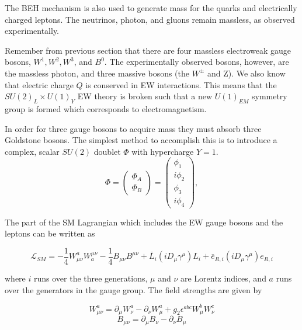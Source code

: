 The BEH mechanism is also used to generate mass for the quarks and electrically charged leptons. The neutrinos, photon, and gluons remain massless, as observed experimentally.
	
Remember from previous section that there are four massless electroweak gauge bosons, $W^{1}, W^{2}, W^{3}$, and $B^{0}$. The experimentally observed bosons, however, are the massless photon, and three massive bosons (the $W^{\pm}$ and Z). We also know that electric charge $Q$ is conserved in EW interactions. This means that the $SU(2)_{L}\times U(1)_{Y}$ EW theory is broken such that a new $U(1)_{EM}$ symmetry group is formed which corresponds to electromagnetism. 
	
In order for three gauge bosons to acquire mass they must absorb three Goldstone bosons. The simplest method to accomplish this is to introduce a complex, scalar $SU(2)$ doublet $\Phi$ with hypercharge $Y=1$.
	\begin{equation}
		\Phi = \begin{pmatrix}
		\Phi_{A} \\
		\Phi_{B}
		\end{pmatrix} = \begin{pmatrix} \phi_{1} \\ i\phi_{2} \\ \phi_{3} \\ i\phi_{4} \end{pmatrix},
	\end{equation}

The part of the SM Lagrangian which includes the EW gauge bosons and the leptons can be written as

	\begin{equation}
	\mathcal{L}_{SM} = -\frac{1}{4}W_{\mu\nu}^{a}W_{a}^{\mu\nu} - \frac{1}{4}B_{\mu\nu}B^{\mu\nu} + \bar{L}_{i}(iD_{\mu}\gamma^{\mu})L_{i} + \bar{e}_{R,i}(iD_{\mu}\gamma^{\mu})e_{R,i}
	\end{equation}

where $i$ runs over the three generations, $\mu$ and $\nu$ are Lorentz indices, and $a$ runs over the generators in the gauge group. The field strengths are given by

	\begin{equation}
	W_{\mu\nu}^{a} = \partial_{\mu}W_{\nu}^{a} - \partial_{\nu}W_{\mu}^{a} + g_{2}\epsilon^{abc}W_{\mu}^{b}W_{\nu}^{c}
	\end{equation}
	\begin{equation}
	B_{\mu\nu} = \partial_{\mu}B_{\nu} - \partial_{\nu}B_{\mu}
	\end{equation}

